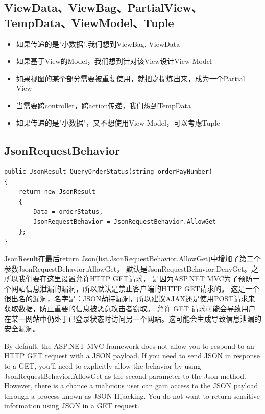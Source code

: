\documentclass{book}
\begin{document}
\subsection{ViewData、ViewBag、PartialView、TempData、ViewModel、Tuple}

\begin{itemize}
\item{如果传递的是"小数据",我们想到ViewBag, ViewData}
\item{如果基于View的Model，我们想到针对该View设计View Model}
\item{如果视图的某个部分需要被重复使用，就把之提炼出来，成为一个Partial View}
\item{当需要跨controller，跨action传递，我们想到TempData}
\item{如果传递的是"小数据"，又不想使用View Model，可以考虑Tuple}
\end{itemize}

\subsection{JsonRequestBehavior}

\begin{lstlisting}[language={[Sharp]C}]
public JsonResult QueryOrderStatus(string orderPayNumber)
{
	return new JsonResult
    {
        Data = orderStatus,
        JsonRequestBehavior = JsonRequestBehavior.AllowGet
    };
}
\end{lstlisting}

JsonResult在最后return Json(list,JsonRequestBehavior.AllowGet)中增加了第二个参数JsonRequestBehavior.AllowGet，
默认是JsonRequestBehavior.DenyGet。之所以我们要在这里设置允许HTTP GET请求，
是因为ASP.NET MVC为了预防一个网站信息泄漏的漏洞，所以默认是禁止客户端的HTTP GET请求的。
这是一个很出名的漏洞，名字是：JSON劫持漏洞，所以建议AJAX还是使用POST请求来获取数据，防止重要的信息被恶意攻击者窃取。
允许 GET 请求可能会导致用户在某一网站中仍处于已登录状态时访问另一个网站。这可能会生成导致信息泄漏的安全漏洞。

By default, the ASP.NET MVC framework does not allow you to respond 
to an HTTP GET request with a JSON payload. If you need to send JSON in response to a GET, 
you'll need to explicitly allow the behavior by using JsonRequestBehavior.AllowGet 
as the second parameter to the Json method. However, there is a chance a malicious 
user can gain access to the JSON payload through a process known as JSON Hijacking. 
You do not want to return sensitive information using JSON in a GET request.
\end{document}
